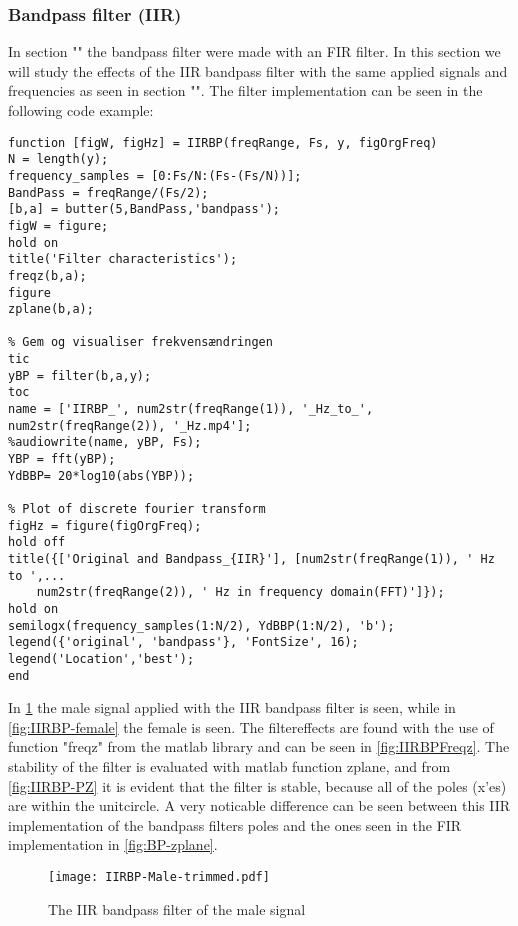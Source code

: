 \subsubsection{Bandpass filter (IIR)}
In section "" the bandpass filter were made with an FIR filter. In this section we will study the effects of the IIR bandpass filter with the same applied signals and frequencies as seen in section "". The filter implementation can be seen in the following code example:

\begin{verbatim}
function [figW, figHz] = IIRBP(freqRange, Fs, y, figOrgFreq)
N = length(y);
frequency_samples = [0:Fs/N:(Fs-(Fs/N))];
BandPass = freqRange/(Fs/2);
[b,a] = butter(5,BandPass,'bandpass');
figW = figure;
hold on
title('Filter characteristics');
freqz(b,a);
figure
zplane(b,a);

% Gem og visualiser frekvensændringen
tic
yBP = filter(b,a,y);
toc
name = ['IIRBP_', num2str(freqRange(1)), '_Hz_to_', num2str(freqRange(2)), '_Hz.mp4'];
%audiowrite(name, yBP, Fs);
YBP = fft(yBP);
YdBBP= 20*log10(abs(YBP));

% Plot of discrete fourier transform
figHz = figure(figOrgFreq);
hold off
title({['Original and Bandpass_{IIR}'], [num2str(freqRange(1)), ' Hz to ',...
	num2str(freqRange(2)), ' Hz in frequency domain(FFT)']});
hold on
semilogx(frequency_samples(1:N/2), YdBBP(1:N/2), 'b');
legend({'original', 'bandpass'}, 'FontSize', 16);
legend('Location','best');
end
\end{verbatim}

In \cref{fig:IIRBP-male} the male signal applied with the IIR bandpass filter is seen, while in \cref{fig:IIRBP-female} the female is seen. The filtereffects are found with the use of function "freqz" from the matlab library and can be seen in \cref{fig:IIRBPFreqz}. The stability of the filter is evaluated with matlab function zplane, and from \cref{fig:IIRBP-PZ} it is evident that the filter is stable, because all of the poles (x'es) are within the unitcircle. A very noticable difference can be seen between this IIR implementation of the bandpass filters poles and the ones seen in the FIR implementation in \cref{fig:BP-zplane}. 

\begin{figure}[h]
\centering
\texttt{[image: IIRBP-Male-trimmed.pdf]}
\caption{The IIR bandpass filter of the male signal}
\label{fig:IIRBP-male}
\end{figure}

